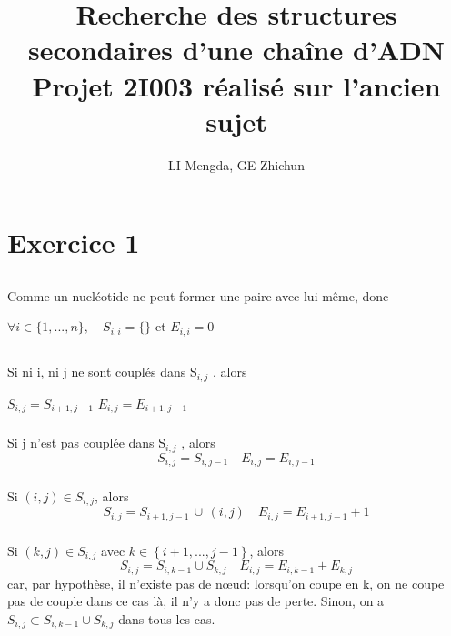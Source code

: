 \documentclass[french]{article}
\title{Recherche des structures secondaires d’une chaîne d’ADN\\
\large Projet 2I003 réalisé sur l'ancien sujet}
\author{LI Mengda, GE Zhichun}
\begin{document}
\lstset{language=Python}	

\maketitle

\section{Exercice 1}

\subsection{}
\label{subsec:q1}
Comme un nucléotide ne peut former une paire avec lui même, donc 

\begin{center}
$\forall i\in\{1,...,n\}, \quad S_{i,i} = \{\}$ et $ E_{i,i} = 0$
\par\end{center}

\subsection{}
\label{subsec:q2}

	\subsubsection{}
	Si ni i, ni j ne sont couplés dans S$_{i,j}$ , alors
	\begin{center}
	$S_{i,j} = S_{i+1,j-1}$ \quad $E_{i,j} = E_{i+1,j-1}$
	\par\end{center}

	\subsubsection{}
	Si j n'est pas couplée dans S$_{i,j}$ , alors
	\[
	S_{i,j} = S_{i,j-1} \quad E_{i,j} = E_{i,j-1}
	\]

	\subsubsection{}
	Si $\left(i,j\right)\in S_{i,j}$, alors
	\[
	S_{i,j}   = S_{i+1,j-1}\, \cup \, \left(i,j\right) \quad  E_{i,j} = E_{i+1,j-1}+ 1
	\]

	\subsubsection{}
	Si $\left(k,j\right)\in S_{i,j}$ avec $k\in\left\{ i+1,...,j-1\right\} $, alors
	\[
	S_{i,j}= S_{i,k-1}\cup S_{k,j} \quad E_{i,j} = E_{i,k-1} + E_{k,j} 
	\]
	car, par hypothèse, il n'existe pas de nœud: lorsqu'on coupe en k, on ne coupe pas de couple dans ce cas là, il n'y a donc pas de perte. Sinon, on a $S_{i,j} \subset S_{i,k-1}\cup S_{k,j} $ dans tous les cas.
\end{document}
